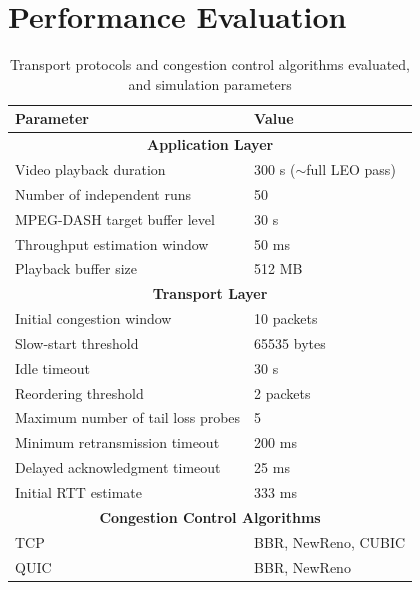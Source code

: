 \documentclass[journal]{IEEEtran}
\begin{document}
\section*{Performance Evaluation}

\begin{table}[t]
\centering
\caption{Transport protocols and congestion control algorithms evaluated, and simulation parameters}
\label{tab:simulation_parameters}

\renewcommand{\arraystretch}{1.18}
\setlength{\tabcolsep}{6pt}

\begin{tabular}{|p{}|p{}|}
\hline
\textbf{Parameter} & \textbf{Value} \\ \hline

\multicolumn{2}{|c|}{\rule{0pt}{2.5ex}\textbf{Application Layer}} \\ \hline
Video playback duration & 300 s ($\sim$full LEO pass) \\ \hline
Number of independent runs & 50 \\ \hline
MPEG-DASH target buffer level & 30 s \\ \hline
Throughput estimation window & 50 ms \\ \hline
Playback buffer size & 512 MB \\ \hline

\multicolumn{2}{|c|}{\rule{0pt}{2.5ex}\textbf{Transport Layer}} \\ \hline
Initial congestion window & 10 packets \\ \hline
Slow-start threshold & 65535 bytes \\ \hline
Idle timeout & 30 s \\ \hline
Reordering threshold & 2 packets \\ \hline
Maximum number of tail loss probes & 5 \\ \hline
Minimum retransmission timeout & 200 ms \\ \hline
Delayed acknowledgment timeout & 25 ms \\ \hline
Initial RTT estimate & 333 ms \\ \hline

\multicolumn{2}{|c|}{\rule{0pt}{2.5ex}\textbf{Congestion Control Algorithms}} \\ \hline
TCP & BBR, NewReno, CUBIC \\ \hline
QUIC & BBR, NewReno \\ \hline


\end{tabular}
\end{table}
\end{document}
